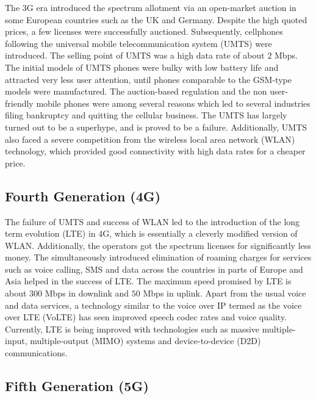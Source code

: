 \begin{multicols}{2}
The 3G era introduced the spectrum allotment via an open-market auction in some European countries such as the UK and Germany. Despite the high quoted prices, a few licenses were successfully auctioned. Subsequently, cellphones following the universal mobile telecommunication system (UMTS) were introduced. The selling point of UMTS was a high data rate of about $2$ Mbps. The initial models of UMTS phones were bulky with low battery life and attracted very less user attention, until phones comparable to the GSM-type models were manufactured. The auction-based regulation and the non user-friendly mobile phones were among several reasons which led to several industries filing bankruptcy and quitting the cellular business. The UMTS has largely turned out to be a superhype, and is proved to be a failure. Additionally, UMTS also faced a severe competition from the wireless local area network (WLAN) technology, which provided good connectivity with high data rates for a cheaper price.

\subsection{Fourth Generation (4G)} \label{SubSec_4G}

The failure of UMTS and success of WLAN led to the introduction of the long term evolution (LTE) in 4G, which is essentially a cleverly modified version of WLAN. Additionally, the operators got the spectrum licenses for significantly less money. The simultaneously introduced elimination of roaming charges for services such as voice calling, SMS and data across the  countries in parts of Europe and Asia helped in the success of LTE. The maximum speed promised by LTE is about $300$ Mbps in downlink and $50$ Mbps in uplink. Apart from the usual voice and data services, a technology similar to the voice over IP termed as the voice over LTE (VoLTE) has seen improved speech codec rates and voice quality. Currently, LTE is being improved with technologies such as massive multiple-input, multiple-output (MIMO) systems and device-to-device (D2D) communications.

\subsection{Fifth Generation (5G)} \label{SubSec_5G}


\end{multicols}
